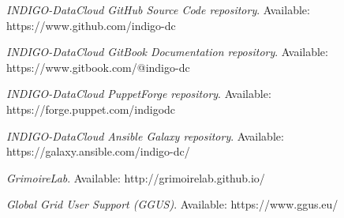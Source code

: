 \documentclass[journal]{IEEEtran}
\begin{document}
\begin{thebibliography}{1}
\emph{INDIGO-DataCloud GitHub Source Code repository}. Available: https://www.github.com/indigo-dc

\emph{INDIGO-DataCloud GitBook Documentation repository}. Available: https://www.gitbook.com/@indigo-dc

\emph{INDIGO-DataCloud PuppetForge repository}. Available: https://forge.puppet.com/indigodc

\emph{INDIGO-DataCloud Ansible Galaxy repository}. Available: https://galaxy.ansible.com/indigo-dc/

\emph{GrimoireLab}. Available: http://grimoirelab.github.io/

\emph{Global Grid User Support (GGUS)}. Available: https://www.ggus.eu/

\end{thebibliography}



\end{document}
